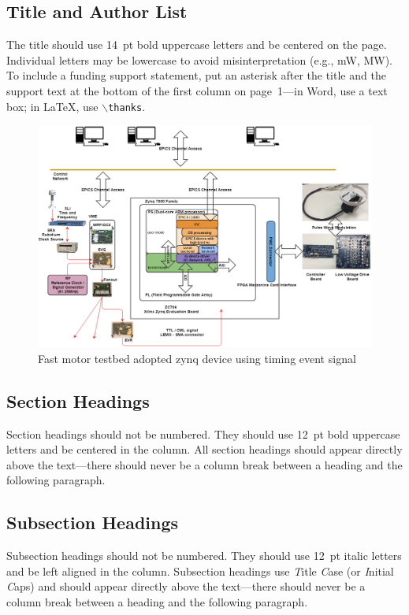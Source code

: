 \documentclass[a4paper,
              ]{jacow}
\begin{document}
\subsection{Title and Author List}
The title should use \SI{14}{pt} bold uppercase letters and be centered on the page.
Individual letters may be lowercase to avoid misinterpretation (e.g., mW, MW).
To include a funding support statement, put an asterisk after the title and
the support text at the bottom of the first column on page~1---in Word,
use a text box; in \LaTeX, use $\backslash$\texttt{thanks}.
\begin{figure}[!tbh]
    \centering
    \includegraphics*[width=\textwidth]{motor-testbed}
    \caption{Fast motor testbed adopted zynq device using timing event signal}
    \label{stepper}
\end{figure}



\subsection{Section Headings}

Section headings should not be numbered. They should
use  \SI{12}{pt}  bold  uppercase  letters  and  be  centered  in  the
column. All section headings should appear directly above
the text---there should never be a column break between a heading and the
following paragraph.

\subsection{Subsection Headings}

Subsection  headings  should  not  be  numbered.
They should use \SI{12}{pt} italic letters and be left aligned in the column.
Subsection headings use \emph{T}itle \emph{C}ase (or \emph{I}nitial \emph{C}aps)
and should appear directly above the text---there should never be a column break
between a heading and the following paragraph.
\end{document}
